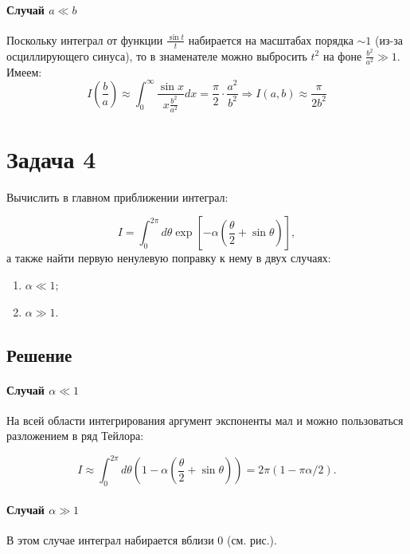 \documentclass[a4paper,12pt]{article}
\begin{document}
\paragraph{Случай $a\ll b$}

Поскольку интеграл от функции $\frac{\sin t}{t}$ набирается на масштабах
порядка $\sim1$ (из-за осциллирующего синуса), то в знаменателе можно
выбросить $t^{2}$ на фоне $\frac{b^{2}}{a^{2}}\gg1$. Имеем:
\[
I\left(\frac{b}{a}\right)\approx\int_{0}^{\infty}\frac{\sin x}{x\frac{b^{2}}{a^{2}}}dx=\frac{\pi}{2}\cdot\frac{a^{2}}{b^{2}} \Rightarrow I(a,b) \approx \frac{\pi}{2 b^2}
\]

\section*{Задача 4}

Вычислить в главном приближении интеграл:

$$
I=\int_{0}^{2\pi}d\theta \exp\left[-\alpha\left(\frac{\theta}{2}+\sin\theta\right)\right],
$$
а также найти первую ненулевую поправку к нему в двух случаях:
\begin{multicols}{2}
\begin{enumerate}[label=\arabic*)]
    \item $\alpha\ll1$;
    \item $\alpha\gg1$.
\end{enumerate}
\end{multicols}
\noindent

\subsection*{Решение}

\paragraph{Случай $\alpha\ll 1$}

На всей области интегрирования аргумент экспоненты мал и можно пользоваться разложением в ряд Тейлора:

\[
I\approx\int_{0}^{2\pi}d\theta\left(1-\alpha\left(\frac{\theta}{2}+\sin\theta\right)\right)=2\pi\left(1-\pi\alpha/2\right).
\]

\paragraph{Случай $\alpha\gg 1$}

В этом случае интеграл набирается вблизи 0 (см. рис.).
\end{document}
